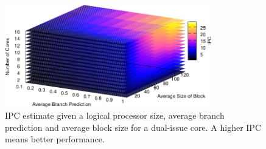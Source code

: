 \begin{figure}[t]
    \centering
    \includegraphics[width=0.8\textwidth]{cases-paper/graphics/limit_study/summary.pdf}
    \caption{IPC estimate given a logical processor size, average branch prediction and average block size for a dual-issue core. A higher IPC means better performance.}
    \label{fig:lm_summ}
\vspace{5mm}
\end{figure}
